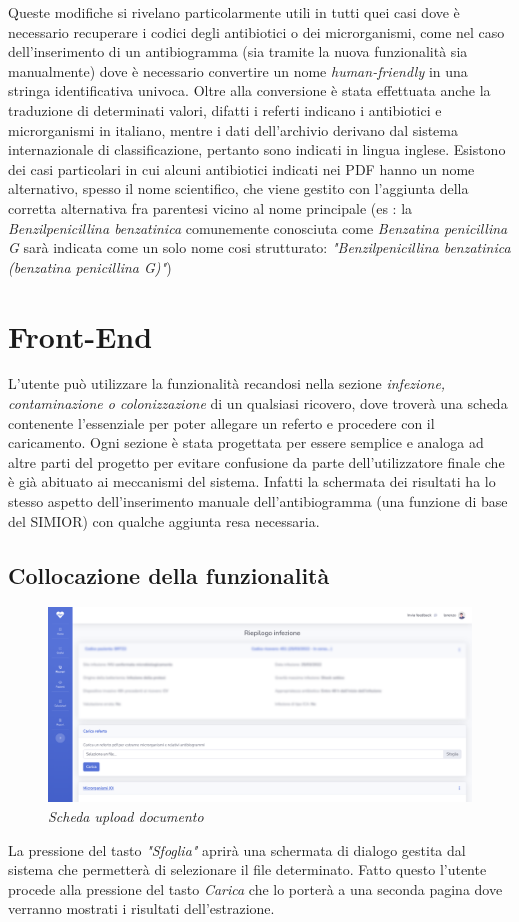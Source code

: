 Queste modifiche si rivelano particolarmente utili in tutti quei casi dove è necessario recuperare i codici degli antibiotici o dei microrganismi, come nel caso dell'inserimento di un antibiogramma (sia tramite la nuova funzionalità sia manualmente) dove è necessario convertire un nome \textit{human-friendly} in una stringa identificativa univoca.
Oltre alla conversione è stata effettuata anche la traduzione di determinati valori, difatti i referti indicano i antibiotici e microrganismi in italiano, mentre i dati dell'archivio derivano dal sistema internazionale di classificazione, pertanto sono indicati in lingua inglese. Esistono dei casi particolari in cui alcuni antibiotici indicati nei PDF hanno un nome alternativo, spesso il nome scientifico, che viene gestito con l'aggiunta della corretta alternativa fra parentesi vicino al nome principale (es : la \textit{Benzilpenicillina benzatinica} comunemente conosciuta come \textit{Benzatina penicillina G} sarà indicata come un solo nome cosi strutturato: \textit{"Benzilpenicillina benzatinica (benzatina penicillina G)"})
\newpage
\section{Front-End}
L'utente può utilizzare la funzionalità recandosi nella sezione \textit{infezione, contaminazione o colonizzazione} di un qualsiasi ricovero, dove troverà una scheda contenente l'essenziale per poter allegare un referto e procedere con il caricamento.
Ogni sezione è stata progettata per essere semplice e analoga ad altre parti del progetto per evitare confusione da parte dell'utilizzatore finale che è già abituato ai meccanismi del sistema. Infatti la schermata dei risultati ha lo stesso aspetto dell'inserimento manuale dell'antibiogramma (una funzione di base del SIMIOR) con qualche aggiunta resa necessaria.
\subsection{Collocazione della funzionalità}
\begin{figure}[h!]
	\centering
	\includegraphics[width=.99\columnwidth]{images/feature_location.png}
	\caption{\textit{Scheda upload documento}}
	\label{fig:feature_location}
\end{figure}
La pressione del tasto \textit{"Sfoglia"} aprirà una schermata di dialogo gestita dal sistema che permetterà di selezionare il file determinato. Fatto questo l'utente procede alla pressione del tasto \textit{Carica} che lo porterà a una seconda pagina dove verranno mostrati i risultati dell'estrazione.
\newpage

